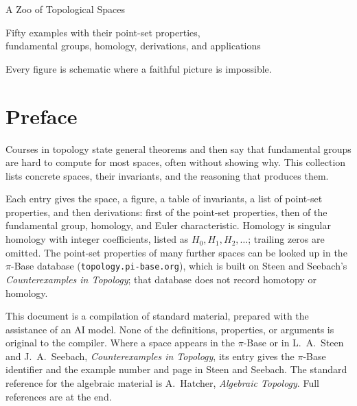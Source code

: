 \documentclass[11pt,twoside]{book}
\begin{document}
\frontmatter
\begin{titlepage}\centering\vspace*{1.6in}
{\Huge A Zoo of Topological Spaces}\par\vspace{.3in}
{\large Fifty examples with their point-set properties,\\ fundamental groups, homology, derivations, and applications}\par\vfill
{\small Every figure is schematic where a faithful picture is impossible.}\end{titlepage}
\chapter*{Preface}
Courses in topology state general theorems and then say that fundamental groups are hard to compute for most spaces, often without showing why. This collection lists concrete spaces, their invariants, and the reasoning that produces them.

Each entry gives the space, a figure, a table of invariants, a list of point-set properties, and then derivations: first of the point-set properties, then of the fundamental group, homology, and Euler characteristic. Homology is singular homology with integer coefficients, listed as $H_0,H_1,H_2,\dots$; trailing zeros are omitted. The point-set properties of many further spaces can be looked up in the $\pi$-Base database (\texttt{topology.pi-base.org}), which is built on Steen and Seebach's \emph{Counterexamples in Topology}; that database does not record homotopy or homology.

This document is a compilation of standard material, prepared with the assistance of an AI model. None of the definitions, properties, or arguments is original to the compiler. Where a space appears in the $\pi$-Base or in L.~A.~Steen and J.~A.~Seebach, \emph{Counterexamples in Topology}, its entry gives the $\pi$-Base identifier and the example number and page in Steen and Seebach. The standard reference for the algebraic material is A.~Hatcher, \emph{Algebraic Topology}. Full references are at the end.

\tableofcontents
\mainmatter
\end{document}
